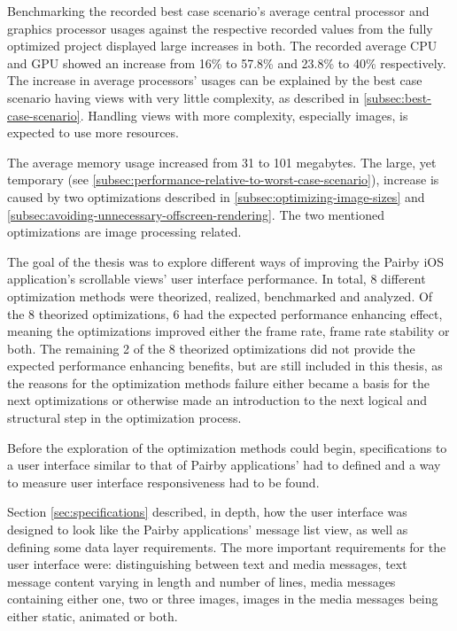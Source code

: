 \documentclass[a4paper,12pt]{article}
\begin{document}
Benchmarking the recorded best case scenario's average central processor and graphics processor usages against the respective recorded values from the fully optimized project displayed large increases in both. The recorded average CPU and GPU showed an increase from 16\% to 57.8\% and 23.8\% to 40\% respectively. The increase in average processors' usages can be explained by the best case scenario having views with very little complexity, as described in \autoref{subsec:best-case-scenario}. Handling views with more complexity, especially images, is expected to use more resources.

The average memory usage increased from 31 to 101 megabytes. The large, yet temporary (see \autoref{subsec:performance-relative-to-worst-case-scenario}), increase is caused by two optimizations described in \autoref{subsec:optimizing-image-sizes} and \autoref{subsec:avoiding-unnecessary-offscreen-rendering}. The two mentioned optimizations are image processing related.

The goal of the thesis was to explore different ways of improving the Pairby iOS application's scrollable views' user interface performance. In total, 8 different optimization methods were theorized, realized, benchmarked and analyzed. Of the 8 theorized optimizations, 6 had the expected performance enhancing effect, meaning the optimizations improved either the frame rate, frame rate stability or both. The remaining 2 of the 8 theorized optimizations did not provide the expected performance enhancing benefits, but are still included in this thesis, as the reasons for the optimization methods failure either became a basis for the next optimizations or otherwise made an introduction to the next logical and structural step in the optimization process.

Before the exploration of the optimization methods could begin, specifications to a user interface similar to that of Pairby applications' had to defined and a way to measure user interface responsiveness had to be found.

Section \ref{sec:specifications} described, in depth, how the user interface was designed to look like the Pairby applications' message list view, as well as defining some data layer requirements. The more important requirements for the user interface were: distinguishing between text and media messages, text message content varying in length and number of lines, media messages containing either one, two or three images, images in the media messages being either static, animated or both.
\end{document}
